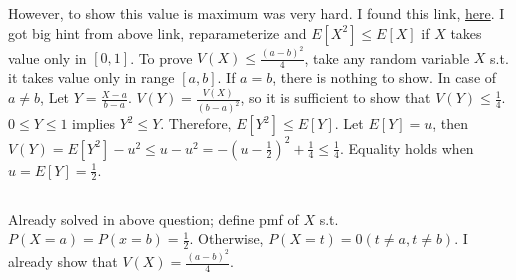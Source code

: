 \documentclass{article}
\begin{document}
However, to show this value is maximum was very hard.
I found this link, \href{https://stats.stackexchange.com/questions/45588/variance-of-a-bounded-random-variable}{here}.
I got big hint from above link, reparameterize and $E[X^2] \leq E[X]$ if $X$ takes value only in $[0,1]$.
To prove $V(X) \leq \frac{(a-b)^2}{4}$, take any random variable $X$ s.t. it takes value only in range $[a,b]$.
If $a=b$, there is nothing to show.
In case of $a \neq b$, Let $Y=\frac{X-a}{b-a}$.
$V(Y)=\frac{V(X)}{(b-a)^2}$, so it is sufficient to show that $V(Y) \leq \frac{1}{4}$.
$0 \leq Y \leq 1$ implies $Y^2 \leq Y$.
Therefore, $E[Y^2] \leq E[Y]$.
Let $E[Y]=u$, then
$V(Y) = E[Y^2] - u^2
\leq u - u^2
= -(u-\frac{1}{2})^2 + \frac{1}{4}
\leq \frac{1}{4}$.
Equality holds when $u=E[Y]=\frac{1}{2}$.

\subsection{}
Already solved in above question; define pmf of $X$ s.t. $P(X=a)=P(x=b)=\frac{1}{2}$.
Otherwise, $P(X=t)=0 (t \neq a, t \neq b)$.
I already show that $V(X) = \frac{(a-b)^2}{4}$.
\end{document}
